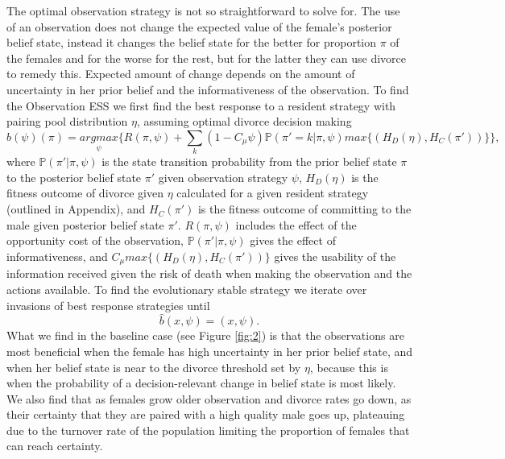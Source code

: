 \documentclass[10pt]{article} %
\begin{document}
The optimal observation strategy is not so straightforward to solve for. The use of an observation does not change the expected value of the female's posterior belief state, instead it changes the belief state for the better for proportion $\pi$ of the females and for the worse for the rest, but for the latter they can use divorce to remedy this. Expected amount of change depends on the amount of uncertainty in her prior belief and the informativeness of the observation. To find the Observation ESS we first find the best response to a resident strategy with pairing pool distribution $\eta$, assuming optimal divorce decision making 
\begin{equation}
	\hat{b}(\psi)(\pi)=\underset{\psi}{argmax}\{R(\pi,\psi)+\underset{k}{\sum}(1-C_{\mu}\psi)\mathbb{P}(\pi'=k|\pi,\psi)\underset{}{max}\{(H_{D}(\eta),H_{C}(\pi'))\}\}, \label{eq:26-1}	
\end{equation}
where $\mathbb{P}(\pi'|\pi,\psi)$ is the state transition probability from the prior belief state $\pi$ to the posterior belief state $\pi'$ given observation strategy $\psi$, $H_{D}(\eta)$ is the fitness outcome of divorce given $\eta$ calculated for a given resident strategy (outlined in Appendix), and $H_{C}(\pi')$ is the fitness outcome of committing to the male given posterior belief state $\pi'$. $R(\pi,\psi)$ includes the effect of the opportunity cost of the observation, $\mathbb{P}(\pi'|\pi,\psi)$ gives the effect of informativeness, and $C_\mu \underset{}{max}\{(H_{D}(\eta),H_{C}(\pi'))\}$ gives the usability of the information received given the risk of death when making the observation and the actions available.
To find the evolutionary stable strategy we iterate over invasions of best response strategies until
\begin{equation}
	\hat{b}(x,\psi)=(x,\psi).\label{eq:26}
\end{equation}
What we find in the baseline case (see Figure \ref{fig:2}) is that the observations are most beneficial when the female has high uncertainty in her prior belief state, and when her belief state is near to the divorce threshold set by $\eta$, because this is when the probability of a decision-relevant change in belief state is most likely. We also find that as females grow older observation and divorce rates go down, as their certainty that they are paired with a high quality male goes up, plateauing due to the turnover rate of the population limiting the proportion of females that can reach certainty.
\end{document}
